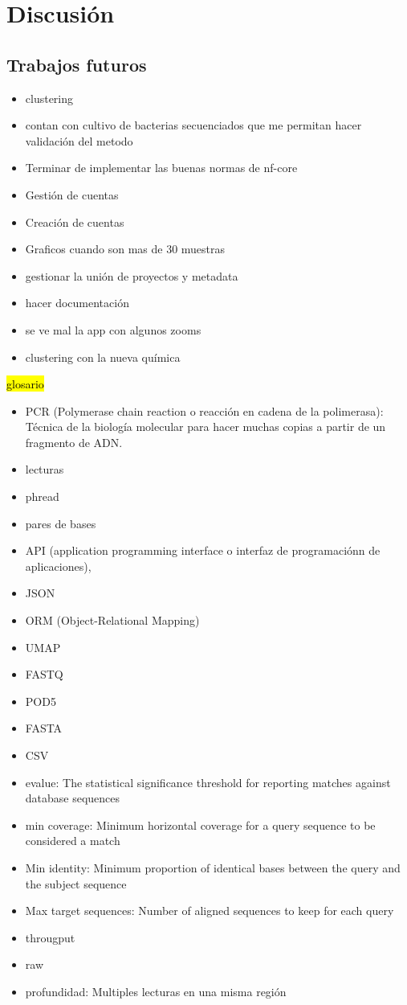 \chapter{Discusión}
\section{Trabajos futuros}
\begin{itemize}
    \item clustering
    \item contan con cultivo de bacterias secuenciados que me permitan hacer validación del metodo
    \item Terminar de implementar las buenas normas de nf-core
    \item Gestión de cuentas
    \item Creación de cuentas
    \item Graficos cuando son mas de 30 muestras
    \item gestionar la unión de proyectos y metadata
    \item hacer documentación
    \item se ve mal la app con algunos zooms 
    \item clustering con la nueva química   
\end{itemize}
\hl{glosario}
\begin{itemize}
    \item PCR (Polymerase chain reaction o reacción en cadena de la polimerasa): Técnica de la biología molecular para hacer muchas copias a partir de un fragmento de ADN.
    \item lecturas
    \item phread
    \item pares de bases
    \item API (application programming interface o interfaz de programaciónn de aplicaciones),
    \item JSON
    \item ORM (Object-Relational Mapping)
    \item UMAP
    \item FASTQ
    \item POD5
    \item FASTA
    \item CSV
    \item evalue: The statistical significance threshold for reporting matches against database sequences
    \item min coverage: Minimum horizontal coverage for a query sequence to be considered a match
    \item Min identity: Minimum proportion of identical bases between the query and the subject sequence
    \item Max target sequences: Number of aligned sequences to keep for each query
    \item througput
    \item raw
    \item profundidad: Multiples lecturas en una misma región
\end{itemize}
